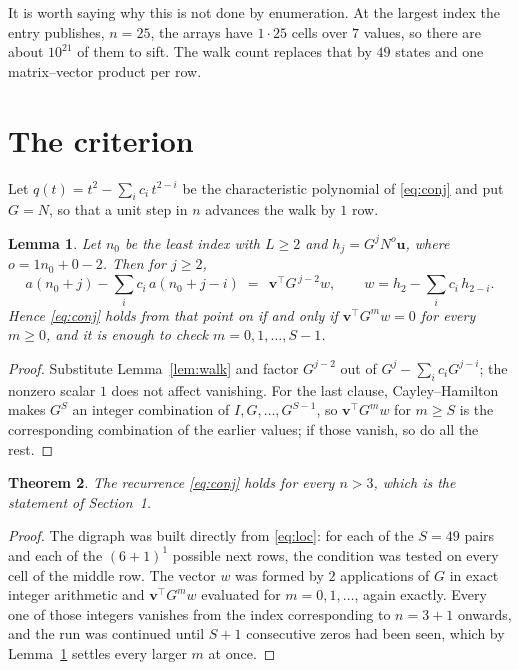 \documentclass[11pt,a4paper]{article}
\theoremstyle{plain}
\newtheorem{theorem}{Theorem}
\newtheorem{lemma}[theorem]{Lemma}
\theoremstyle{definition}
\begin{document}
It is worth saying why this is not done by enumeration. At the largest index the entry
publishes, $n=25$, the arrays have $1\cdot25$ cells over
$7$ values, so there are about $10^{21}$ of them to sift. The
walk count replaces that by $49$ states and one matrix--vector product per row.
\section{The criterion}

Let $q(t)=t^{2}-\sum_i c_i\,t^{2-i}$ be the characteristic polynomial of
\eqref{eq:conj} and put $G=N$, so that a unit step in $n$ advances the walk by
$1$ row.

\begin{lemma}\label{lem:crit}
Let $n_0$ be the least index with $L\ge2$ and $h_j=G^{j}N^{o}\mathbf{u}$, where
$o=1n_0+0-2$. Then for $j\ge2$,
\[
a(n_0+j)-\sum_i c_i\,a(n_0+j-i)\;=\;\,\mathbf{v}^{\!\top}G^{\,j-2}w,
\qquad w=h_{2}-\sum_i c_i\,h_{2-i} .
\]
Hence \eqref{eq:conj} holds from that point on if and only if
$\mathbf{v}^{\!\top}G^{m}w=0$ for every $m\ge0$, and it is enough to check
$m=0,1,\dots,S-1$.
\end{lemma}

\begin{proof}
Substitute Lemma~\ref{lem:walk} and factor $G^{j-2}$ out of
$G^{j}-\sum_ic_iG^{j-i}$; the nonzero scalar $1$ does not affect
vanishing. For the last clause, Cayley--Hamilton makes $G^{S}$ an integer combination of
$I,G,\dots,G^{S-1}$, so $\mathbf{v}^{\!\top}G^{m}w$ for $m\ge S$ is the corresponding
combination of the earlier values; if those vanish, so do all the rest.
\end{proof}

\begin{theorem}
The recurrence \eqref{eq:conj} holds for every $n>3$, which is the statement of
Section~1.
\end{theorem}

\begin{proof}
The digraph was built directly from \eqref{eq:loc}: for each of the $S=49$ pairs and each
of the $(6+1)^{1}$ possible next rows, the condition was tested on every cell of
the middle row. The vector $w$ was formed by $2$ applications of $G$ in exact integer
arithmetic and $\mathbf{v}^{\!\top}G^{m}w$ evaluated for $m=0,1,\dots$, again exactly.
Every one of those integers vanishes from the index corresponding to $n=3+1$ onwards,
and the run was continued until $S+1$ consecutive zeros had been seen, which by
Lemma~\ref{lem:crit} settles every larger $m$ at once.
\end{proof}
\end{document}
